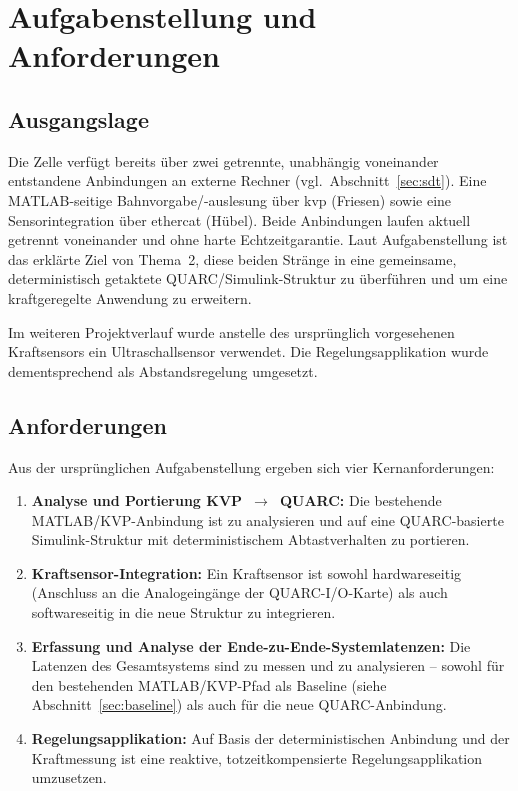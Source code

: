 \section{Aufgabenstellung und Anforderungen}
\label{sec:aufgabenstellung}

\subsection{Ausgangslage}
\label{sec:ausgangslage}

Die Zelle verfügt bereits über zwei getrennte, unabhängig voneinander
entstandene Anbindungen an externe Rechner (vgl.\ Abschnitt~\ref{sec:sdt}).
Eine MATLAB-seitige Bahnvorgabe/-auslesung über \ac{kvp} (Friesen) sowie eine
Sensorintegration über \ac{ethercat} (Hübel). Beide Anbindungen laufen aktuell
getrennt voneinander und ohne harte Echtzeitgarantie. Laut Aufgabenstellung
ist das erklärte Ziel von Thema~2, diese beiden Stränge in eine gemeinsame,
deterministisch getaktete QUARC/Simulink-Struktur zu überführen und um eine
kraftgeregelte Anwendung zu erweitern.

Im weiteren Projektverlauf wurde anstelle des ursprünglich vorgesehenen
Kraftsensors ein Ultraschallsensor verwendet. Die
Regelungsapplikation wurde dementsprechend als Abstandsregelung umgesetzt.

\subsection{Anforderungen}
\label{sec:anforderungen}

Aus der ursprünglichen Aufgabenstellung ergeben sich vier
Kernanforderungen:

\begin{enumerate}
    \item \textbf{Analyse und Portierung KVP~$\rightarrow$~QUARC:} Die
    bestehende MATLAB/KVP-Anbindung ist zu analysieren und auf eine
    QUARC-basierte Simulink-Struktur mit deterministischem Abtastverhalten
    zu portieren.
    \item \textbf{Kraftsensor-Integration:} Ein Kraftsensor ist sowohl
    hardwareseitig (Anschluss an die Analogeingänge der QUARC-I/O-Karte) als
    auch softwareseitig in die neue Struktur zu integrieren.
    \item \textbf{Erfassung und Analyse der Ende-zu-Ende-Systemlatenzen:} Die
    Latenzen des Gesamtsystems sind zu messen und zu analysieren -- sowohl
    für den bestehenden MATLAB/KVP-Pfad als Baseline (siehe
    Abschnitt~\ref{sec:baseline}) als auch für die neue QUARC-Anbindung.
    \item \textbf{Regelungsapplikation:} Auf Basis der deterministischen
    Anbindung und der Kraftmessung ist eine reaktive, totzeitkompensierte
    Regelungsapplikation umzusetzen.
\end{enumerate}
